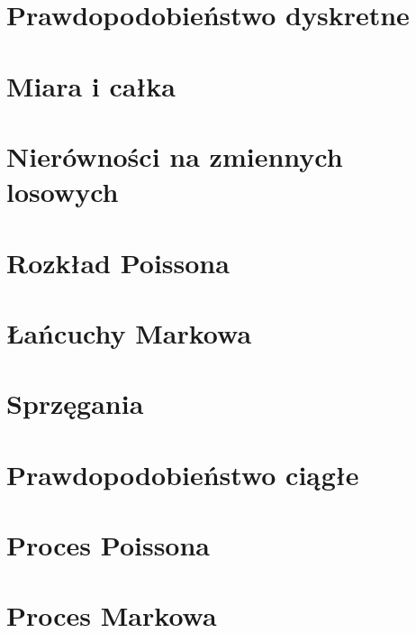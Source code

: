 \documentclass[12pt, a4paper, polish, openany]{book}
\author{
}
\begin{document}
\frontmatter



\tableofcontents


\mainmatter

\chapter{Prawdopodobieństwo dyskretne}


\chapter{Miara i całka}


\chapter{Nierówności na zmiennych losowych}


\chapter{Rozkład Poissona}


\chapter{Łańcuchy Markowa}


\chapter{Sprzęgania}


\chapter{Prawdopodobieństwo ciągłe}


\chapter{Proces Poissona}


\chapter{Proces Markowa}

\end{document}
